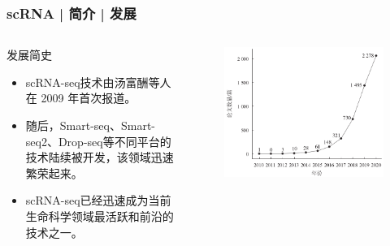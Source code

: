 \documentclass[11pt]{ctexbeamer}
\begin{document}
\begin{frame}
  \frametitle{scRNA | 简介 |  发展}
    \begin{columns}
  \begin{block}{发展简史}
  \begin{itemize}
    \item scRNA-seq技术由\alert{汤富酬}等人在 \alert{2009} 年首次报道。
    \item 随后，Smart-seq、Smart-seq2、Drop-seq等不同平台的技术陆续被开发，该领域迅速繁荣起来。
    \item scRNA-seq已经迅速成为当前生命科学领域\alert{最活跃和前沿}的技术之一。
  \end{itemize}
  \end{block}
   \begin{figure}
    \centering
    \includegraphics[width=\textwidth]{scRNA_history_01.png}
  \end{figure}
  \end{columns}
\end{frame}
\end{document}
